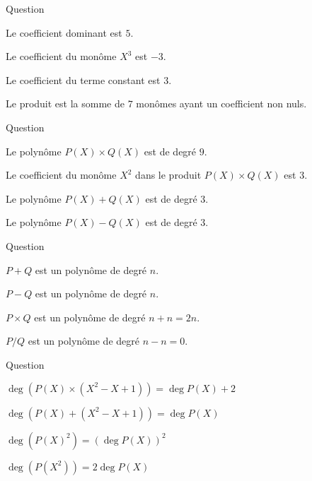 

\begin{multi}[multiple,feedback=
{\(P(X)\times Q(X) = 6 X^7 - 4 X^6 + 6 X^5 + 9 X^4 - 3 X^3 + 7 X^2 + 3 X\).
}]{Question}
    \item Le coefficient dominant est \(5\).
    \item* Le coefficient du monôme \(X^3\) est \(-3\).
    \item Le coefficient du terme constant est \(3\).
    \item* Le produit est la somme de \(7\) monômes ayant un coefficient non nuls.
\end{multi}


\begin{multi}[multiple,feedback=
{\(P(X)\times Q(X) = X^6 - 3 X^5 - X^4 + 6 X^3 - 3 X^2 - 2 X + 2\), 
\(P(X) + Q(X) = 2 X^3 - 3 X^2 - X + 3\),
\(P(X) - Q(X) = -3 X^2 + X + 1\).
}]{Question}
    \item Le polynôme \(P(X) \times Q(X)\) est de degré \(9\).
    \item Le coefficient du monôme \(X^2\) dans le produit \(P(X) \times Q(X)\) est \(3\).
    \item* Le polynôme \(P(X) + Q(X)\) est de degré \(3\).
    \item Le polynôme \(P(X) - Q(X)\) est de degré \(3\).
\end{multi}


\begin{multi}[multiple,feedback=
{Le quotient de deux polynômes n'est pas un polynôme.
}]{Question}
    \item* \(P+Q\) est un polynôme de degré \(n\).
    \item \(P-Q\) est un polynôme de degré \(n\).
    \item* \(P \times Q\) est un polynôme de degré \(n+n=2n\).
    \item \(P/Q\) est un polynôme de degré \(n-n=0\).
\end{multi}


\begin{multi}[multiple,feedback=
{On a la formule \(\deg(P\times Q) = \deg P + \deg Q\) mais, il n'y a pas de formule pour la somme, car \(\deg(P + Q)\) peut être strictement plus petit que \(\deg P\) et \(\deg Q\).
}]{Question}
    \item* \(\deg( P(X) \times (X^2-X+1) ) = \deg P(X) + 2\)
    \item \(\deg( P(X) + (X^2-X+1) ) = \deg P(X)\)
    \item \(\deg( P(X)^2 ) = (\deg P(X))^2\)
    \item* \(\deg( P(X^2) ) = 2\deg P(X)\)
\end{multi}



